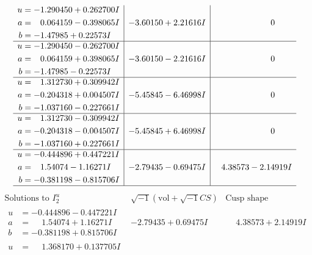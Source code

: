 \documentclass[1p]{elsarticle_modified}
\theoremstyle{definition}
\newcommand{\I}{\sqrt{-1}}
\begin{document}
$$\begin{array}{c|c|c}
\begin{aligned}
u &= -1.290450 + 0.262700 I \\
a &= \phantom{-}0.064159 - 0.398065 I \\
b &= -1.47985 + 0.22573 I\end{aligned}
 & -3.60150 + 2.21616 I & \phantom{-0.000000 } 0 \\ \hline\begin{aligned}
u &= -1.290450 - 0.262700 I \\
a &= \phantom{-}0.064159 + 0.398065 I \\
b &= -1.47985 - 0.22573 I\end{aligned}
 & -3.60150 - 2.21616 I & \phantom{-0.000000 } 0 \\ \hline\begin{aligned}
u &= \phantom{-}1.312730 + 0.309942 I \\
a &= -0.204318 + 0.004507 I \\
b &= -1.037160 - 0.227661 I\end{aligned}
 & -5.45845 - 6.46998 I & \phantom{-0.000000 } 0 \\ \hline\begin{aligned}
u &= \phantom{-}1.312730 - 0.309942 I \\
a &= -0.204318 - 0.004507 I \\
b &= -1.037160 + 0.227661 I\end{aligned}
 & -5.45845 + 6.46998 I & \phantom{-0.000000 } 0 \\ \hline\begin{aligned}
u &= -0.444896 + 0.447221 I \\
a &= \phantom{-}1.54074 - 1.16271 I \\
b &= -0.381198 - 0.815706 I\end{aligned}
 & -2.79435 - 0.69475 I & \phantom{-}4.38573 - 2.14919 I\\
 \hline 
 \end{array}$$\newpage$$\begin{array}{c|c|c}  
\text{Solutions to }I^u_{2}& \I (\text{vol} + \sqrt{-1}CS) & \text{Cusp shape}\\
 \hline 
\begin{aligned}
u &= -0.444896 - 0.447221 I \\
a &= \phantom{-}1.54074 + 1.16271 I \\
b &= -0.381198 + 0.815706 I\end{aligned}
 & -2.79435 + 0.69475 I & \phantom{-}4.38573 + 2.14919 I \\ \hline\begin{aligned}
u &= \phantom{-}1.368170 + 0.137705 I \\

\end{aligned}
\end{array}$$
\end{document}

